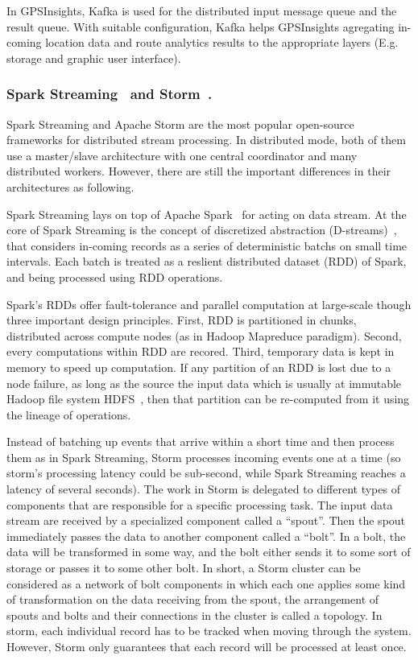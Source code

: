 \documentclass{acm_proc_article-sp}
\begin{document}
In GPSInsights, Kafka is used for the distributed input message queue and the result queue. With suitable configuration, Kafka helps GPSInsights agregating in-coming location data and route analytics results to the appropriate layers (E.g. storage and graphic user interface).

\subsubsection{Spark Streaming~\cite{learningsparkbook,sparkstreamingweb} and Storm~\cite{stormappliedbook,apachestormweb}.}

Spark Streaming and Apache Storm are the most popular open-source frameworks for distributed stream processing. In distributed mode, both of them use a master/slave architecture with one central coordinator and many distributed workers. However, there are still the important differences in their architectures as following.

Spark Streaming lays on top of Apache Spark~\cite{Zaharia:2010:SCC:1863103.1863113} for acting on data stream.
 At the core of Spark Streaming is the concept of discretized abstraction (D-streams)~\cite{Zaharia:2013:DSF:2517349.2522737,Zaharia:2012:DSE:2342763.2342773}, that considers in-coming records as a series of deterministic batchs on small time intervals. Each batch is treated as a reslient distributed dataset (RDD) of Spark, and being processed using RDD operations. 

 Spark's RDDs offer fault-tolerance and parallel computation at large-scale though three important design principles. First, RDD is partitioned in chunks, distributed across compute nodes (as in Hadoop Mapreduce paradigm). Second, every computations within RDD are recored. Third, temporary data is kept in memory to speed up computation. If any partition of an RDD is lost due to a node failure, as long as the source the input data which is usually at immutable Hadoop file system HDFS~\cite{shvachko2010hadoop}, then that partition can be re-computed from it using the lineage of operations.

Instead of batching up events that arrive within a short time and then process them as in Spark Streaming, Storm processes incoming events one at a time (so storm's processing latency could be sub-second, while Spark Streaming reaches a latency of several seconds). The work in Storm is delegated to different types of components that are responsible for a specific processing task. The input data stream are received by a specialized component called a ``spout''. Then the spout immediately passes the data to another component called a ``bolt''. In a bolt, the data will be transformed in some way, and the bolt either sends it to some sort of storage or passes it to some other bolt. In short, a Storm cluster can be considered as a network of bolt components in which each one applies some kind of transformation on the data receiving from the spout, the arrangement of spouts and bolts and their connections in the cluster is called a topology. In storm, each individual record has to be tracked when moving through the system. However, Storm only guarantees that each record will be processed at least once.
\end{document}
